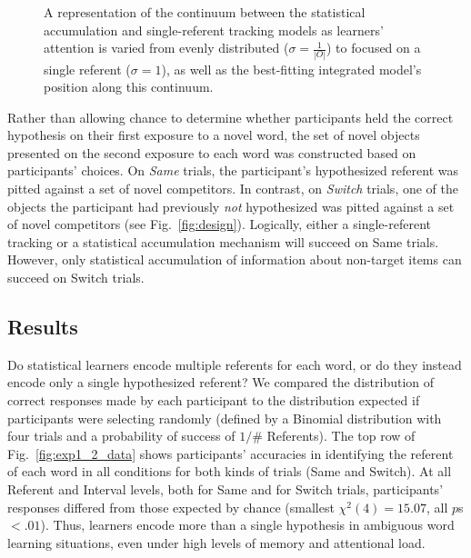 \documentclass{pnastwo}
\begin{document}
\begin{article}
 \begin{figure}[t]
	\caption{\label{fig:models} A representation of the continuum between the statistical accumulation and single-referent tracking models as learners' attention is varied from evenly distributed ($\sigma=\frac{1}{|O|}$) to focused on a single referent ($\sigma=1$), as well as the best-fitting integrated model's position along this continuum.}
\end{figure}

Rather than allowing chance to determine whether participants held the correct hypothesis on their first exposure to a novel word, the set of novel objects presented on the second exposure to each word was constructed based on participants' choices. On \emph{Same} trials, the participant's hypothesized referent was pitted against a set of novel competitors. In contrast, on \emph{Switch} trials, one of the objects the participant had previously \emph{not} hypothesized was pitted against a set of novel competitors (see Fig.~\ref{fig:design}). Logically, either a single-referent tracking or a statistical accumulation mechanism will succeed on Same trials. However, only statistical accumulation of information about non-target items can  succeed on Switch trials.

\subsection{Results}


Do statistical learners encode multiple referents for each word, or do they instead encode only a single hypothesized referent? We compared the distribution of correct responses made by each participant to the distribution expected if participants were selecting randomly (defined by a Binomial distribution with four trials and a probability of success of  $1/$\# Referents). The top row of Fig.~\ref{fig:exp1_2_data} shows participants' accuracies in identifying the referent of each word in all conditions for both kinds of trials (Same and Switch). At all Referent and Interval levels, both for Same and for Switch trials, participants' responses differed from those expected by chance (smallest $\chi^{2}(4) = 15.07$, all $p$s $< .01$). Thus, learners encode more than a single hypothesis in ambiguous word learning situations, even under high levels of memory and attentional load. 



\end{article}
\end{document}
